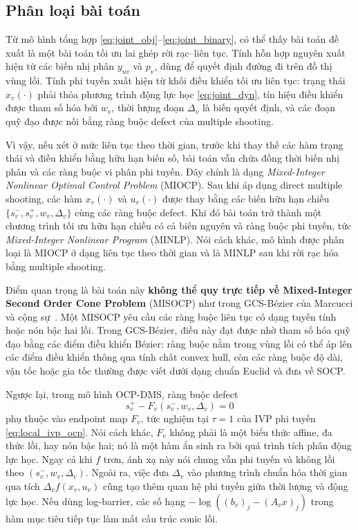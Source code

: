\subsection{Phân loại bài toán}
\label{subsec:problem_class}

Từ mô hình tổng hợp \eqref{eq:joint_obj}--\eqref{eq:joint_binary}, có thể thấy bài toán đề xuất là một bài toán tối ưu lai ghép rời rạc--liên tục. Tính hỗn hợp nguyên xuất hiện từ các biến nhị phân $y_{uv}$ và $p_v$, dùng để quyết định đường đi trên đồ thị vùng lồi. Tính phi tuyến xuất hiện từ khối điều khiển tối ưu liên tục: trạng thái $x_v(\cdot)$ phải thỏa phương trình động lực học \eqref{eq:joint_dyn}, tín hiệu điều khiển được tham số hóa bởi $w_v$, thời lượng đoạn $\Delta_v$ là biến quyết định, và các đoạn quỹ đạo được nối bằng ràng buộc defect của multiple shooting.

Vì vậy, nếu xét ở mức liên tục theo thời gian, trước khi thay thế các hàm trạng thái và điều khiển bằng hữu hạn biến số, bài toán vẫn chứa đồng thời biến nhị phân và các ràng buộc vi phân phi tuyến. Đây chính là dạng \emph{Mixed-Integer Nonlinear Optimal Control Problem} (MIOCP). Sau khi áp dụng direct multiple shooting, các hàm $x_v(\cdot)$ và $u_v(\cdot)$ được thay bằng các biến hữu hạn chiều $\{s_v^-,s_v^+,w_v,\Delta_v\}$ cùng các ràng buộc defect. Khi đó bài toán trở thành một chương trình tối ưu hữu hạn chiều có cả biến nguyên và ràng buộc phi tuyến, tức \emph{Mixed-Integer Nonlinear Program} (MINLP). Nói cách khác, mô hình được phân loại là MIOCP ở dạng liên tục theo thời gian và là MINLP sau khi rời rạc hóa bằng multiple shooting.

Điểm quan trọng là bài toán này \textbf{không thể quy trực tiếp về Mixed-Integer Second Order Cone Problem} (MISOCP) như trong GCS-Bézier của Marcucci và cộng sự~\cite{MarcucciEtAl2023GCS, Marcucci2024Thesis}. Một MISOCP yêu cầu các ràng buộc liên tục có dạng tuyến tính hoặc nón bậc hai lồi. Trong GCS-Bézier, điều này đạt được nhờ tham số hóa quỹ đạo bằng các điểm điều khiển Bézier: ràng buộc nằm trong vùng lồi có thể áp lên các điểm điều khiển thông qua tính chất convex hull, còn các ràng buộc độ dài, vận tốc hoặc gia tốc thường được viết dưới dạng chuẩn Euclid và đưa về SOCP.

Ngược lại, trong mô hình OCP-DMS, ràng buộc defect
\[
s_v^+ - F_v(s_v^-,w_v,\Delta_v)=0
\]
phụ thuộc vào endpoint map $F_v$, tức nghiệm tại $\tau=1$ của IVP phi tuyến \eqref{eq:local_ivp_ocp}. Nói cách khác, $F_v$ không phải là một biểu thức affine, đa thức lồi, hay nón bậc hai; nó là một hàm ẩn sinh ra bởi quá trình tích phân động lực học. Ngay cả khi $f$ trơn, ánh xạ này nói chung vẫn phi tuyến và không lồi theo $(s_v^-,w_v,\Delta_v)$. Ngoài ra, việc đưa $\Delta_v$ vào phương trình chuẩn hóa thời gian qua tích $\Delta_v f(x_v,u_v)$ cũng tạo thêm quan hệ phi tuyến giữa thời lượng và động lực học. Nếu dùng log-barrier, các số hạng $-\log((b_v)_j-(A_vx)_j)$ trong hàm mục tiêu tiếp tục làm mất cấu trúc conic lồi.

